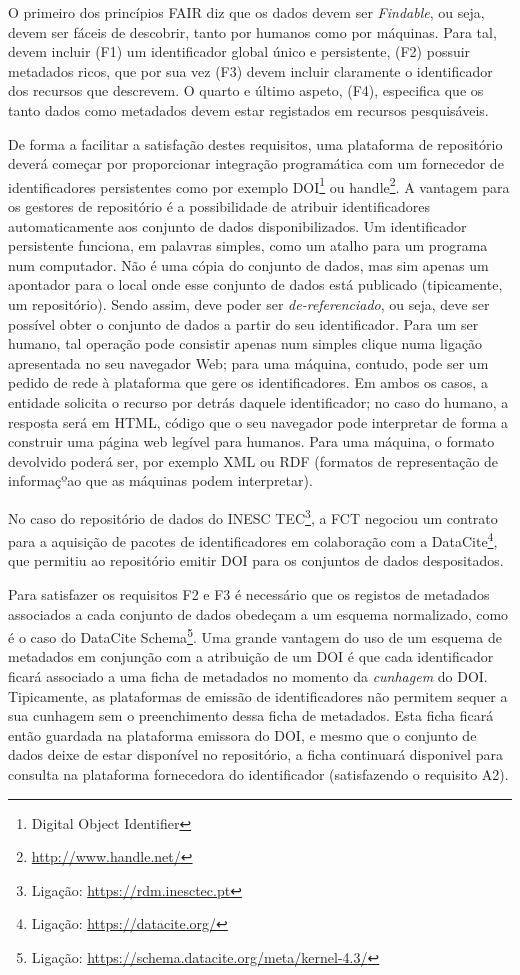 \documentclass[sigconf,nonacm]{acmart}
\begin{document}
O primeiro dos princípios FAIR diz que os dados devem ser \emph{Findable}, ou seja, devem ser fáceis de descobrir, tanto por humanos como por máquinas. Para tal, devem incluir (F1) um identificador global único e persistente, (F2) possuir metadados ricos, que por sua vez (F3) devem incluir claramente o identificador dos recursos que descrevem. O quarto e último aspeto, (F4), especifica que os tanto dados como metadados devem estar registados em recursos pesquisáveis. 

De forma a facilitar a satisfação destes requisitos, uma plataforma de repositório deverá começar por proporcionar integração programática com um fornecedor de identificadores persistentes como por exemplo DOI\footnote{Digital Object Identifier} ou handle\footnote{\url{http://www.handle.net/}}. A vantagem para os gestores de repositório é a possibilidade de atribuir identificadores automaticamente aos conjunto de dados disponibilizados. Um identificador persistente funciona, em palavras simples, como um atalho para um programa num computador. Não é uma cópia do conjunto de dados, mas sim apenas um apontador para o local onde esse conjunto de dados está publicado (tipicamente, um repositório). Sendo assim, deve poder ser \emph{de-referenciado}, ou seja, deve ser possível obter o conjunto de dados a partir do seu identificador. Para um ser humano, tal operação pode consistir apenas num simples clique numa ligação apresentada no seu navegador Web; para uma máquina, contudo, pode ser um pedido de rede à plataforma que gere os identificadores. Em ambos os casos, a entidade solicita o recurso por detrás daquele identificador; no caso do humano, a resposta será em HTML, código que o seu navegador pode interpretar de forma a construir  uma página web legível para humanos. Para uma máquina, o formato devolvido poderá ser, por exemplo XML ou RDF (formatos de representação de informaçºao que as máquinas podem interpretar). 

No caso do repositório de dados do INESC TEC\footnote{Ligação: \url{https://rdm.inesctec.pt}}, a FCT negociou um contrato para a aquisição de pacotes de identificadores em colaboração com a DataCite\footnote{Ligação: \url{https://datacite.org/}}, que permitiu ao repositório emitir DOI para os conjuntos de dados despositados. 

Para satisfazer os requisitos F2 e F3 é necessário que os registos de metadados associados a cada conjunto de dados obedeçam a um esquema normalizado, como é o caso do DataCite Schema\footnote{Ligação: \url{https://schema.datacite.org/meta/kernel-4.3/}}. Uma grande vantagem do uso de um esquema de metadados em conjunção com a atribuição de um DOI é que cada identificador ficará associado a uma ficha de metadados no momento da \emph{cunhagem} do DOI. Tipicamente, as plataformas de emissão de identificadores não permitem sequer a sua cunhagem sem o preenchimento dessa ficha de metadados. Esta ficha ficará então guardada na plataforma emissora do DOI, e mesmo que o conjunto de dados deixe de estar disponível no repositório, a ficha continuará disponivel para consulta na plataforma fornecedora do identificador (satisfazendo o requisito A2).
\end{document}
